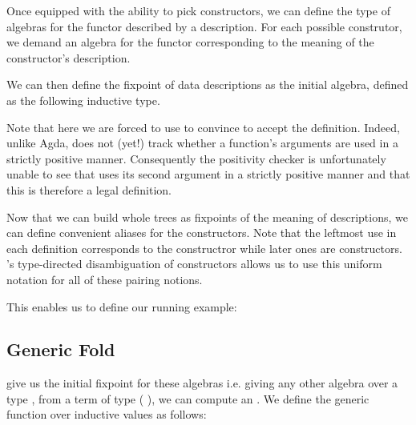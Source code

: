 Once equipped with the ability to pick constructors, we can define
the type of algebras for the functor described by a 
description. For each possible construtor, we demand an algebra for
the functor corresponding to the meaning of the  constructor's description.


We can then define the fixpoint of data descriptions as the initial
algebra, defined as the following inductive type.



Note that here we are forced to use \assertTotal{} to convince \idris{}
to accept the definition.
%
Indeed, unlike Agda, \idris{} does not (yet!) track whether a function's
arguments are used in a strictly positive manner.
%
Consequently the positivity checker
is unfortunately unable to see that  uses its second
argument in a strictly positive manner
and that this is therefore a legal definition.

Now that we can build whole trees as fixpoints of the
meaning of descriptions, we can define convenient aliases for
the  constructors.
%
Note that the leftmost \IdrisData{(\#)} use in each definition corresponds
to the  constructror while later ones are 
constructors.
%
\idris{}'s type-directed disambiguation of constructors allows us to use
this uniform notation for all of these pairing notions.


This enables us to define our running example:


\subsection{Generic Fold}\label{sec:genericfoldinductive}

 give us the initial fixpoint for these algebras i.e.
giving any other algebra over a type , from a term of
type ( ), we can compute an .
%
We define the generic  function over inductive values
as follows:


